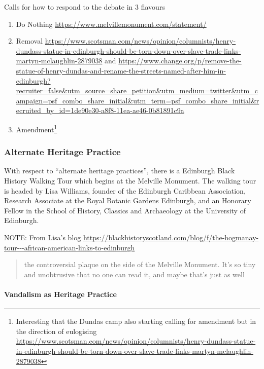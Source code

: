 \documentclass{scrartcl}
\begin{document}
Calls for how to respond to the debate in 3 flavours

\begin{enumerate}
    \item Do Nothing \url{https://www.melvillemonument.com/statement/}
    \item Removal \url{https://www.scotsman.com/news/opinion/columnists/henry-dundass-statue-in-edinburgh-should-be-torn-down-over-slave-trade-links-martyn-mclaughlin-2879038} and \url{https://www.change.org/p/remove-the-statue-of-henry-dundas-and-rename-the-streets-named-after-him-in-edinburgh?recruiter=false&utm_source=share_petition&utm_medium=twitter&utm_campaign=psf_combo_share_initial&utm_term=psf_combo_share_initial&recruited_by_id=1de90e30-a8f8-11ea-ae46-0b81891c9a}
    \item Amendment\footnote{Interesting that the Dundas camp also starting calling for amendment but in the direction of eulogising \url{https://www.scotsman.com/news/opinion/columnists/henry-dundass-statue-in-edinburgh-should-be-torn-down-over-slave-trade-links-martyn-mclaughlin-2879038}} \cite{esclr_2022}
\end{enumerate}

\subsubsection{Alternate Heritage Practice}

With respect to ``alternate heritage practices'', there is a Edinburgh Black History Walking Tour which begins at the Melville Monument.
The walking tour is headed by Lisa Williams, founder of the Edinburgh Caribbean Association, Research Associate at the Royal Botanic Gardens Edinburgh, and an Honorary Fellow in the School of History, Classics and Archaeology at the University of Edinburgh. 

NOTE: From Lisa's blog \url{https://blackhistoryscotland.com/blog/f/the-hogmanay-tour---african-american-links-to-edinburgh}

\begin{quotation}
    the controversial plaque on the side of the Melville Monument. It's so tiny and unobtrusive that no one can read it, and maybe that's just as well
\end{quotation}


\paragraph{Vandalism as Heritage Practice}
\end{document}
